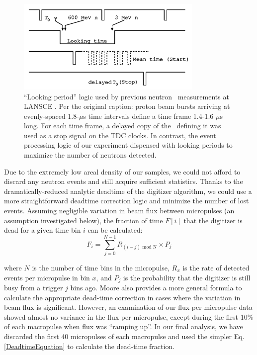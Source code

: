 \begin{figure}[h]
    \includegraphics[width=0.8\textwidth]{figures/AnalogLogic.png}
    \caption[``Looking period'' logic used by previous neutron \tot\ measurements at LANSCE]
    {
        ``Looking period'' logic used by previous neutron \tot\ measurements at LANSCE
        \cite{Abfalterer2001}. Per the original caption: proton beam bursts arriving at
        evenly-spaced 1.8-$\mu$s time intervals define a time frame 1.4-1.6 $\mu$s long. For each
        time frame, a delayed copy of the \tZero\ defining it was used as a stop signal on the TDC
    clocks. In contrast, the event processing logic of our experiment dispensed with looking 
    periods to maximize the number of neutrons detected.}
    \label{AnalogLogic}
\end{figure}

Due to the extremely low areal density of our samples,
we could not afford to discard any neutron events and still acquire sufficient statistics. 
Thanks to the dramatically-reduced analytic deadtime of the digitizer algorithm,
we could use a more straightforward deadtime correction logic and minimize the
number of lost events. Assuming negligible variation in beam flux between micropulses
(an assumption investigated below), the fraction of time $F[i]$ that the digitizer is dead 
for a given time bin $i$ can be calculated:
\begin{equation}
    F_{i} = \sum^{N-1}_{j=0} R_{(i-j)\text{ mod N}}\times P_{j}
\end{equation}

\noindent
where $N$ is the number of time bins in the micropulse, $R_{x}$ is the rate of
detected events per micropulse in bin $x$, and $P_{j}$ is the probability that the
digitizer is still busy from a trigger $j$ bins ago. Moore \cite{Moore1980} also provides
a more general 
formula to calculate the appropriate dead-time correction in cases where the variation in beam 
flux is significant. However, an examination of our flux-per-micropulse data 
showed almost no variance in the flux per micropulse, except during the first 10\%
of each macropulse when flux was ``ramping up''. In our final analysis, we have discarded the 
first 40 micropulses of each macropulse and used the simpler Eq. \ref{DeadtimeEquation} to 
calculate the dead-time fraction.

